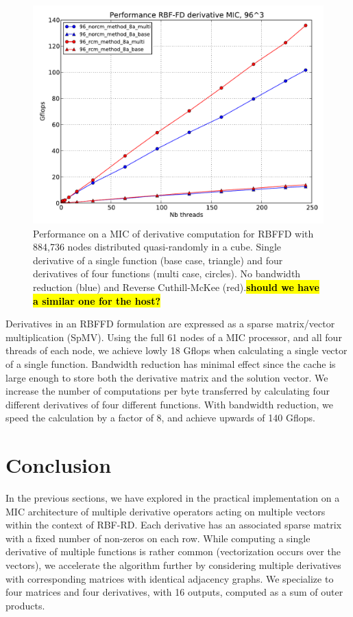 \documentclass[10pt,conference,compsocconf]{IEEEtran}
\newcommand{\todo}[1]{{\color{red}\textbf{\hl{#1}}\xspace}}
\begin{document}
\begin{figure}
  \centering
  \includegraphics[width=\linewidth]{figures/plot_for_natasha_ncar_end_of_year.pdf}

  \caption{Performance on a MIC of derivative computation for RBFFD
    with 884,736 nodes distributed quasi-randomly in a cube. Single
    derivative of a single function (base case, triangle) and four
    derivatives of four functions (multi case, circles). No bandwidth
    reduction (blue) and Reverse Cuthill-McKee (red).\todo{should we have a similar one for the host?}}
\end{figure}

Derivatives in an RBFFD formulation are expressed as a sparse
matrix/vector multiplication (SpMV). Using the full 61 nodes of a MIC
processor, and all four threads of each node, we achieve lowly 18
Gflops when calculating a single vector of a single
function. Bandwidth reduction has minimal effect since the cache is
large enough to store both the derivative matrix and the solution
vector. We increase the number of computations per byte transferred by
calculating four different derivatives of four different
functions. With bandwidth reduction, we speed the calculation by a
factor of 8, and achieve upwards of 140 Gflops.


\section{Conclusion}
\label{sec:ccl}

In the previous sections, we have explored in the practical
implementation on a MIC architecture of multiple derivative operators
acting on multiple vectors within the context of RBF-RD. Each
derivative has an associated sparse matrix with a fixed number of
non-zeros on each row. While computing a single derivative of multiple
functions is rather common (vectorization occurs over the vectors), we
accelerate the algorithm further by considering multiple derivatives
with corresponding matrices with identical adjacency graphs. We
specialize to four matrices and four derivatives, with 16 outputs,
computed as a sum of outer products.
\end{document}
